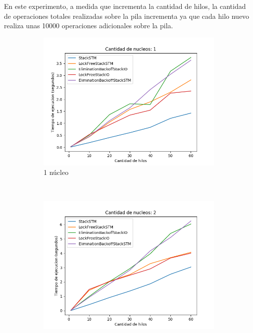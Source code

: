 En este experimento, a medida que incrementa la cantidad de hilos, la cantidad de operaciones totales realizadas sobre la pila incrementa ya que cada hilo nuevo realiza unas 10000 operaciones adicionales sobre la pila.

\begin{figure}[t]
    \centering
    \begin{subfigure}[b]{0.49\textwidth}
        \includegraphics[width=\textwidth]{images/numberOfThreads/plots/1.png}
        \caption{1 núcleo}
        \label{subfig:numberOfThreads-1core}
    \end{subfigure}
    ~
    \begin{subfigure}[b]{0.49\textwidth}
        \includegraphics[width=\textwidth]{images/numberOfThreads/plots/2.png}

\end{subfigure}
\end{figure}
